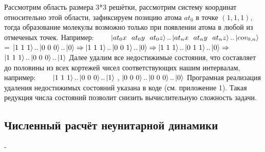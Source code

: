\documentclass[12pt, a4paper]{article}
\begin{document}
\newline\null\qquad
Рассмотрим область размера 3*3 решётки, рассмотрим систему координат относительно этой области, зафиксируем позицию атома $at_0$ в точке $(1,1,1)$, тогда образование молекулы возможно только при появлении атома в любой из отмеченых точек. Например:\newline \null
$\qquad \ket{at_0x\ \ at_0y\ \ at_0z}..\ket{at_nx\ \ at_ny\ \ at_nz}..\ket{cov_{0,n}}$ = $\ket{1\ 1\ 1}..\ket{0 \ 0 \ 0}..\ket{0} \Rightarrow \ket{1\ 1\ 1}..\ket{0 \ 0 \ 1}..\ket{0} \Rightarrow \ket{1\ 1\ 1}..\ket{0 \ 1 \ 1}..\ket{0} \Rightarrow$ $\ket{1\ 1\ 1}..\ket{0 \ 0 \ 0}..\ket{1}$\newline \null\qquad
Далее удалим все недостижимые состояния, что составляет до половины из всех кортежей чисел соответствующих нашим интервалам, например:\newline \null
$\qquad\ket{1\ 1\ 1}..\ket{0 \ 0 \ 0}..\ket{1}$ 
, 
$\ket{0\ 0\ 0}..\ket{0 \ 0 \ 0}..\ket{0}$\newline \null\qquad
Програмная реализация удаления недостижимых состояний указана в коде (см. приложение 1). Такая редукция числа состояний позволит снизить вычислительную сложность задачи.
\subsection{Численный расчёт неунитарной динамики}
-
\end{document}

